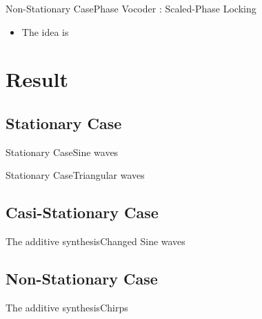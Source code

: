\documentclass{bredelebeamer}
\begin{document}
\begin{frame}{Non-Stationary Case}{Phase Vocoder : Scaled-Phase Locking}
\begin{itemize}
\item The idea is
\end{itemize}

\end{frame}


\section{Result}
\subsection{Stationary Case}
\begin{frame}{Stationary Case}{Sine waves}

\end{frame}
\begin{frame}{Stationary Case}{Triangular waves}

\end{frame}
\subsection{Casi-Stationary Case}
\begin{frame}{The additive synthesis}{Changed Sine waves}

\end{frame}
\subsection{Non-Stationary Case}
\begin{frame}{The additive synthesis}{Chirps}
\end{frame}

\end{document}
